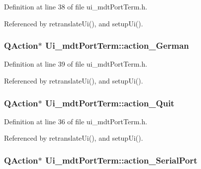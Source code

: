 Definition at line 38 of file ui\-\_\-mdt\-Port\-Term.\-h.



Referenced by retranslate\-Ui(), and setup\-Ui().

\hypertarget{class_ui__mdt_port_term_ae7d374eafa1b37726d80ee9afae84139}{
\subsubsection[{action\-\_\-\-German}]{\setlength{\rightskip}{0pt plus 5cm}Q\-Action$\ast$ Ui\-\_\-mdt\-Port\-Term\-::action\-\_\-\-German}}\label{class_ui__mdt_port_term_ae7d374eafa1b37726d80ee9afae84139}


Definition at line 39 of file ui\-\_\-mdt\-Port\-Term.\-h.



Referenced by retranslate\-Ui(), and setup\-Ui().

\hypertarget{class_ui__mdt_port_term_ad9a01522f2629a8065162cb27afdf474}{
\subsubsection[{action\-\_\-\-Quit}]{\setlength{\rightskip}{0pt plus 5cm}Q\-Action$\ast$ Ui\-\_\-mdt\-Port\-Term\-::action\-\_\-\-Quit}}\label{class_ui__mdt_port_term_ad9a01522f2629a8065162cb27afdf474}


Definition at line 36 of file ui\-\_\-mdt\-Port\-Term.\-h.



Referenced by retranslate\-Ui(), and setup\-Ui().

\hypertarget{class_ui__mdt_port_term_ab0c5b1851589dec225e7e7ba431fd6d8}{
\subsubsection[{action\-\_\-\-Serial\-Port}]{\setlength{\rightskip}{0pt plus 5cm}Q\-Action$\ast$ Ui\-\_\-mdt\-Port\-Term\-::action\-\_\-\-Serial\-Port}}\label{class_ui__mdt_port_term_ab0c5b1851589dec225e7e7ba431fd6d8}


